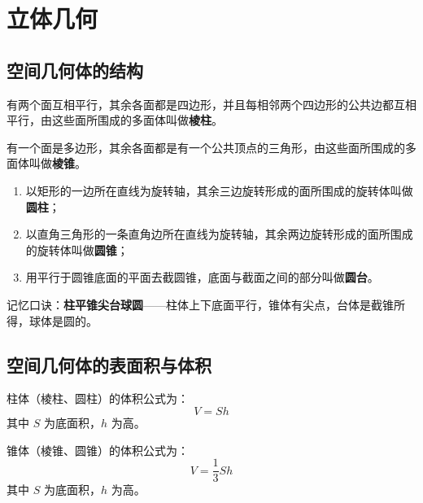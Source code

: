 \chapter{立体几何}

\section{空间几何体的结构}

\begin{definition}[棱柱]
有两个面互相平行，其余各面都是四边形，并且每相邻两个四边形的公共边都互相平行，由这些面所围成的多面体叫做\textbf{棱柱}。
\end{definition}

\begin{definition}[棱锥]
有一个面是多边形，其余各面都是有一个公共顶点的三角形，由这些面所围成的多面体叫做\textbf{棱锥}。
\end{definition}

\begin{definition}[圆柱、圆锥、圆台]
\begin{enumerate}
    \item 以矩形的一边所在直线为旋转轴，其余三边旋转形成的面所围成的旋转体叫做\textbf{圆柱}；
    \item 以直角三角形的一条直角边所在直线为旋转轴，其余两边旋转形成的面所围成的旋转体叫做\textbf{圆锥}；
    \item 用平行于圆锥底面的平面去截圆锥，底面与截面之间的部分叫做\textbf{圆台}。
\end{enumerate}
\end{definition}

\begin{note}
记忆口诀：\textbf{柱平锥尖台球圆}——柱体上下底面平行，锥体有尖点，台体是截锥所得，球体是圆的。
\end{note}

\section{空间几何体的表面积与体积}

\begin{theorem}[柱体的体积]
柱体（棱柱、圆柱）的体积公式为：
\[ V = Sh \]
其中 $S$ 为底面积，$h$ 为高。
\end{theorem}

\begin{theorem}[锥体的体积]
锥体（棱锥、圆锥）的体积公式为：
\[ V = \frac{1}{3}Sh \]
其中 $S$ 为底面积，$h$ 为高。
\end{theorem}

